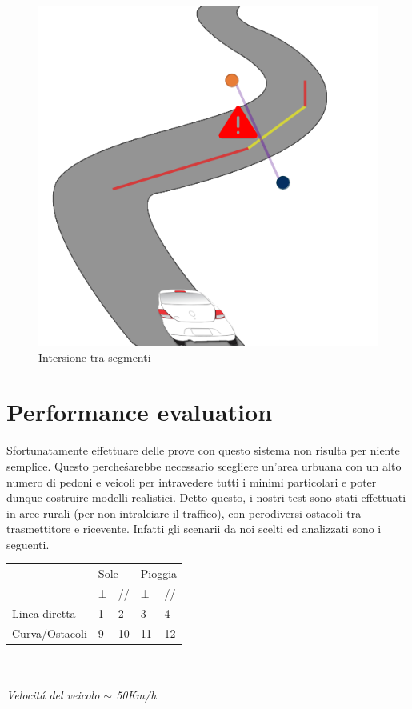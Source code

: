\documentclass[conference]{IEEEtran}
\begin{document}
\begin{figure}[h!]
	\centering
	\includegraphics[width=0.7\linewidth]{prevmod1}
	\caption{Intersione tra segmenti}
	\label{fig:prevmod1}
\end{figure}


\section{Performance evaluation}
Sfortunatamente effettuare delle prove con questo sistema non risulta per niente semplice. Questo perche\' sarebbe necessario scegliere un'area urbuana con un alto numero di pedoni e veicoli per intravedere tutti i minimi particolari e poter dunque costruire modelli realistici.
Detto questo, i nostri test sono stati effettuati in aree rurali (per non intralciare il traffico), con pero\'  diversi ostacoli tra trasmettitore e ricevente.
Infatti gli scenarii da noi scelti ed analizzati sono i seguenti.

\begin{center}


	\begin{tabular}{lll|ll}
		\hline
		& \multicolumn{2}{l|}{Sole} & \multicolumn{2}{l}{Pioggia} \\
		& $\bot$        & //        & $\bot$         & //         \\ \hline
		Linea diretta                     & 1             & 2         & 3              & 4          \\ \hline
		\multicolumn{1}{c}{Curva/Ostacoli} & 9             & 10        & 11             & 12         \\ \hline
	\end{tabular}
\\~\\
\textit{Velocit\'a del veicolo $\sim$ 50Km/h}

\end{center}
\end{document}
